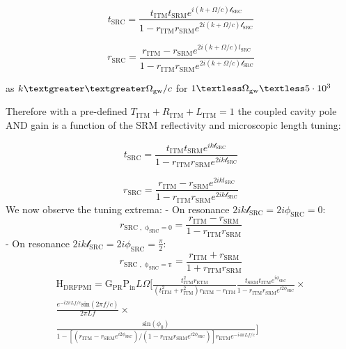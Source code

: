 \begin{equation} t_\mathrm{SRC} = \frac{t_\mathrm{ITM}t_\mathrm{SRM} e^{i  (k + \Omega/c) \mathscr{l}_\mathrm{SRC}}}{1- r_\mathrm{ITM}r_\mathrm{SRM} e^{2i  (k + \Omega/c) \mathscr{l}_\mathrm{SRC}}}\end{equation}

\begin{equation} r_\mathrm{SRC} = \frac{r_\mathrm{ITM} - r_\mathrm{SRM} e^{2i  (k + \Omega/c) l_\mathrm{SRC}}}{1- r_\mathrm{ITM}r_\mathrm{SRM} e^{2i  (k + \Omega/c) \mathscr{l}_\mathrm{SRC}}}\end{equation}

as \(k \textgreater \textgreater \Omega_\mathrm{gw}/c\) for $ 1 \textless \Omega_\mathrm{gw} \textless 5 \cdot 10^3 $

Therefore with a pre-defined
\(T_\mathrm{ITM} + R_\mathrm{ITM} + L_\mathrm{ITM} = 1\) the coupled
cavity pole AND gain is a function of the SRM reflectivity and
microscopic length tuning:

\begin{equation} t_\mathrm{SRC} = \frac{t_\mathrm{ITM}t_\mathrm{SRM} e^{i k \mathscr{l}_\mathrm{SRC}}}{1- r_\mathrm{ITM}r_\mathrm{SRM} e^{2i k \mathscr{l}_\mathrm{SRC}}}\end{equation}

\begin{equation} r_\mathrm{SRC} = \frac{r_\mathrm{ITM} - r_\mathrm{SRM} e^{2i k l_\mathrm{SRC}}}{1- r_\mathrm{ITM}r_\mathrm{SRM} e^{2i k \mathscr{l}_\mathrm{SRC}}}\end{equation}We
now observe the tuning extrema: 
- On resonance
\(2ik \mathscr{l}_\mathrm{SRC} = 2i\phi_\mathrm{SRC} = 0\):
\begin{equation} r_\mathrm{SRC \; , \; \phi_{SRC} = 0} = \frac{r_\mathrm{ITM} - r_\mathrm{SRM}}{1- r_\mathrm{ITM}r_\mathrm{SRM}}\end{equation}
- On resonance $2ik \mathscr{l}_\mathrm{SRC} = 2i\phi_\mathrm{SRC}= \frac{\pi}{2} $:
\begin{equation} r_\mathrm{SRC \; , \; \phi_{SRC} = \pi} = \frac{r_\mathrm{ITM} + r_\mathrm{SRM}}{1+ r_\mathrm{ITM}r_\mathrm{SRM}}\end{equation}
\begin{multline*}
	\mathrm{H}_\mathrm{DRFPMI} =  \mathrm{G}_\mathrm{PR} \mathrm{P}_\mathrm{in} L \Omega \bigg[ \frac{ t_\mathrm{ITM}^2 r_\mathrm{ETM}}{(t_\mathrm{ITM}^2 + r_\mathrm{ITM}^2)r_\mathrm{ETM} - r_\mathrm{ITM}} \frac{t_\mathrm{SRM} t_\mathrm{ITM} e^{i\phi_\mathrm{SRC}}}{1-r_\mathrm{ITM} r_\mathrm{SRM} e^{i2\phi_\mathrm{SRC}}} \times \\
				      \frac{e^{-i 2 \pi L f / c} \mathrm{sin}( 2 \pi f / c)}{ 2 \pi L f } \times \\
				      \frac{\mathrm{sin}(\phi_0)}{1- [(r_\mathrm{ITM} - r_\mathrm{SRM} e^{i2\phi_\mathrm{SRC}})/(1-r_\mathrm{ITM} r_\mathrm{SRM} e^{i2\phi_\mathrm{SRC}})] r_\mathrm{ETM} e^{-i 4 \pi L f / c}} \bigg] 
\end{multline*}

